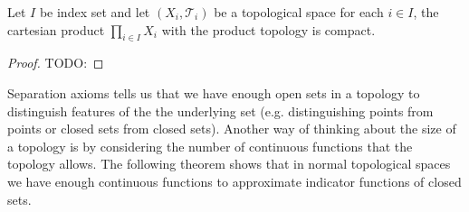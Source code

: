\begin{thm}\label{Tychonoff}Let $I$ be index set
  and let $(X_i,
  \mathcal{T}_i)$ be a topological space for each $i \in I$, the
  cartesian product $\prod_{i \in I} X_i$ with the product topology is
  compact.
\end{thm}
\begin{proof}
TODO:
\end{proof}

Separation axioms tells us that we have enough open sets in a topology
to distinguish features of the the underlying set (e.g. distinguishing
points from points or closed sets from closed sets).  Another way of
thinking about the size of a topology is by considering the number of
continuous functions that the topology allows.  The following theorem
shows that in normal topological spaces we have enough continuous
functions to approximate indicator functions of closed sets.


